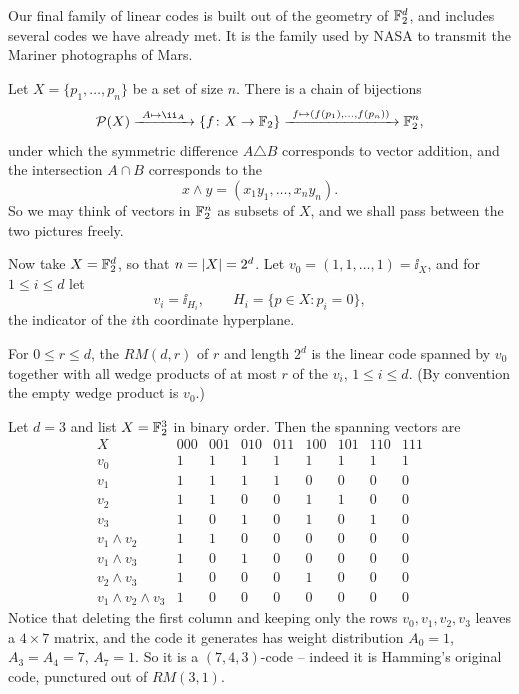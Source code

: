 \documentclass[a4paper]{scrartcl}
\begin{document}
Our final family of linear codes is built out of the geometry of $\mathbb{F}_2^d$, and includes several codes we have already met. It is the family used by NASA to transmit the Mariner photographs of Mars.

Let $X = \{p_1,\dots,p_n\}$ be a set of size $n$. There is a chain of bijections
$$\power(X) \xrightarrow{\ A \mapsto \ii_A\ } \{f\colon X \to \F_2\} \xrightarrow{\ f \mapsto (f(p_1),\dots,f(p_n))\ } \F_2^n,$$
under which the symmetric difference $A \triangle B$ corresponds to vector addition, and the intersection $A \cap B$ corresponds to the 
$$x \wedge y = (x_1y_1,\dots,x_ny_n).$$
So we may think of vectors in $\mathbb{F}_2^n$ as subsets of $X$, and we shall pass between the two pictures freely.

Now take $X = \mathbb{F}_2^d$, so that $n = \lvert X\rvert = 2^d$. Let $v_0 = (1,1,\dots,1) = \ii_X$, and for $1 \le i \le d$ let
$$v_i = \ii_{H_i}, \qquad H_i = \{p \in X : p_i = 0\},$$
the indicator of the $i$th coordinate hyperplane.

\begin{definition}
	For $0 \le r \le d$, the  $RM(d,r)$ of  $r$ and length $2^d$ is the linear code spanned by $v_0$ together with all wedge products of at most $r$ of the $v_i$, $1 \le i \le d$. (By convention the empty wedge product is $v_0$.)
\end{definition}

\begin{example}\label{ex:rm3}
	Let $d = 3$ and list $X = \mathbb{F}_2^3$ in binary order. Then the spanning vectors are
	$$\begin{array}{c|cccccccc}
		X & 000&001&010&011&100&101&110&111\\\hline
		v_0 & 1&1&1&1&1&1&1&1\\
		v_1 & 1&1&1&1&0&0&0&0\\
		v_2 & 1&1&0&0&1&1&0&0\\
		v_3 & 1&0&1&0&1&0&1&0\\
		v_1\wedge v_2 & 1&1&0&0&0&0&0&0\\
		v_1\wedge v_3 & 1&0&1&0&0&0&0&0\\
		v_2\wedge v_3 & 1&0&0&0&1&0&0&0\\
		v_1\wedge v_2\wedge v_3 & 1&0&0&0&0&0&0&0
	\end{array}$$
	Notice that deleting the first column and keeping only the rows $v_0, v_1, v_2, v_3$ leaves a $4\times7$ matrix, and the code it generates has weight distribution $A_0 = 1$, $A_3 = A_4 = 7$, $A_7 = 1$. So it is a $(7,4,3)$-code -- indeed it is Hamming's original code, punctured out of $RM(3,1)$.
\end{example}
\end{document}
